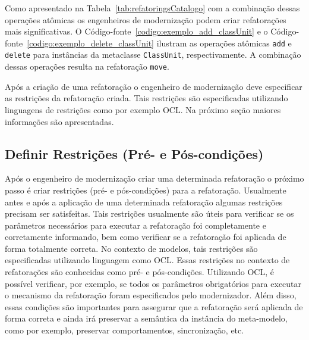 Como apresentado na Tabela~\ref{tab:refatoringsCatalogo} com a combinação dessas operações atômicas os engenheiros de modernização podem criar refatorações mais significativas. O Código-fonte~\ref{codigo:exemplo_add_classUnit} e o Código-fonte~\ref{codigo:exemplo_delete_classUnit} ilustram as operações atômicas \texttt{add} e \texttt{delete} para instâncias da metaclasse \texttt{ClassUnit}, respectivamente. A combinação dessas operações resulta na refatoração \texttt{move}. %

Após a criação de uma refatoração o engenheiro de modernização deve especificar as restrições da refatoração criada. Tais restrições são especificadas utilizando linguagens de restrições como por exemplo OCL. Na próximo seção maiores informações são apresentadas.

\subsection{Definir Restrições (Pré- e Pós-condições)}\label{sec:linguagem_de_restricao}

Após o engenheiro de modernização criar uma determinada refatoração o próximo passo é criar restrições (pré- e pós-condições) para a refatoração. Usualmente antes e após a aplicação de uma determinada refatoração algumas restrições precisam ser satisfeitas. Tais restrições usualmente são úteis para verificar se os parâmetros necessários para executar a refatoração foi completamente e corretamente informando, bem como verificar se a refatoração foi aplicada de forma totalmente correta. No contexto de modelos, tais restrições são especificadas utilizando linguagem como OCL. Essas restrições no contexto de refatorações são conhecidas como pré- e pós-condições. Utilizando OCL, é possível verificar, por exemplo, se todos os parâmetros obrigatórios para executar o mecanismo da refatoração foram especificados pelo modernizador. Além disso, essas condições são importantes para assegurar que a refatoração será aplicada de forma correta e ainda irá preservar a semântica da instância do meta-modelo, como por exemplo, preservar comportamentos, sincronização, etc. 

